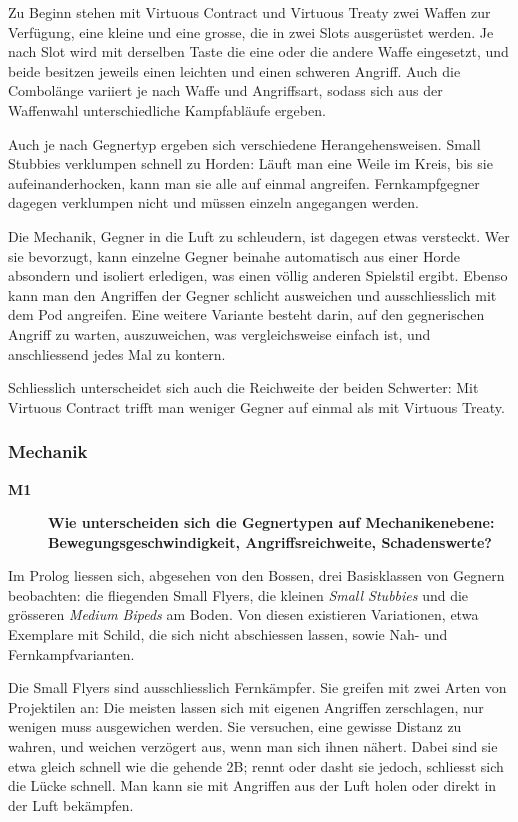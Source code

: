 \documentclass[../Main.tex]{subfiles}
\begin{document}
Zu Beginn stehen mit Virtuous Contract und Virtuous Treaty zwei Waffen zur Verfügung, eine kleine und eine grosse, die in zwei Slots ausgerüstet werden. Je nach Slot wird mit derselben Taste die eine oder die andere Waffe eingesetzt, und beide besitzen jeweils einen leichten und einen schweren Angriff. Auch die Combolänge variiert je nach Waffe und Angriffsart, sodass sich aus der Waffenwahl unterschiedliche Kampfabläufe ergeben.

Auch je nach Gegnertyp ergeben sich verschiedene Herangehensweisen. Small Stubbies verklumpen schnell zu Horden: Läuft man eine Weile im Kreis, bis sie aufeinanderhocken, kann man sie alle auf einmal angreifen. Fernkampfgegner dagegen verklumpen nicht und müssen einzeln angegangen werden.

Die Mechanik, Gegner in die Luft zu schleudern, ist dagegen etwas versteckt. Wer sie bevorzugt, kann einzelne Gegner beinahe automatisch aus einer Horde absondern und isoliert erledigen, was einen völlig anderen Spielstil ergibt. Ebenso kann man den Angriffen der Gegner schlicht ausweichen und ausschliesslich mit dem Pod angreifen. Eine weitere Variante besteht darin, auf den gegnerischen Angriff zu warten, auszuweichen, was vergleichsweise einfach ist, und anschliessend jedes Mal zu kontern.

Schliesslich unterscheidet sich auch die Reichweite der beiden Schwerter: Mit Virtuous Contract trifft man weniger Gegner auf einmal als mit Virtuous Treaty.

\subsubsection{Mechanik}

\begin{description}
    \item[\textbf{M1}] \textbf{Wie unterscheiden sich die Gegnertypen auf Mechanikenebene: Bewegungsgeschwindigkeit, Angriffsreichweite, Schadenswerte?}
\end{description}

Im Prolog liessen sich, abgesehen von den Bossen, drei Basisklassen von Gegnern beobachten: die fliegenden Small Flyers, die kleinen \textit{Small Stubbies} und die grösseren \textit{Medium Bipeds} am Boden. Von diesen existieren Variationen, etwa Exemplare mit Schild, die sich nicht abschiessen lassen, sowie Nah- und Fernkampfvarianten.

Die Small Flyers sind ausschliesslich Fernkämpfer. Sie greifen mit zwei Arten von Projektilen an: Die meisten lassen sich mit eigenen Angriffen zerschlagen, nur wenigen muss ausgewichen werden. Sie versuchen, eine gewisse Distanz zu wahren, und weichen verzögert aus, wenn man sich ihnen nähert. Dabei sind sie etwa gleich schnell wie die gehende 2B; rennt oder dasht sie jedoch, schliesst sich die Lücke schnell. Man kann sie mit Angriffen aus der Luft holen oder direkt in der Luft bekämpfen.
\end{document}
